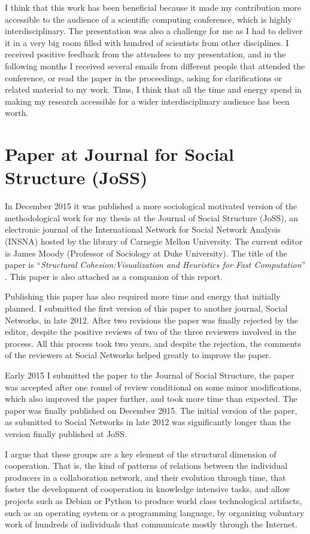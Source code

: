 I think that this work has been beneficial because it made my contribution more accessible to the audience of a scientific computing conference, which is highly interdisciplinary. The presentation was also a challenge for me as I had to deliver it in a very big room filled with hundred of scientists from other disciplines. I received positive feedback from the attendees to my presentation, and in the following months I received several emails from different people that attended the conference, or read the paper in the proceedings, asking for clarifications or related material to my work. Thus, I think that all the time and energy spend in making my research accessible for a wider interdisciplinary audience has been worth.

\section{Paper at Journal for Social Structure (JoSS)}

In December 2015 it was published a more sociological motivated version of the methodological work for my thesis at the Journal of Social Structure (JoSS), an electronic journal of the International Network for Social Network Analysis (INSNA) hosted by the library of Carnegie Mellon University. The current editor is James Moody (Professor of Sociology at Duke University). The title of the paper is ``\textit{Structural Cohesion:Visualization and Heuristics for Fast Computation}'' \citep{torrents:2015}. This paper is also attached as a companion of this report.

Publishing this paper has also required more time and energy that initially planned. I submitted the first version of this paper to another journal, Social Networks, in late 2012. After two revisions the paper was finally rejected by the editor, despite the positive reviews of two of the three reviewers involved in the process. All this process took two years, and despite the rejection, the comments of the reviewers at Social Networks helped greatly to improve the paper.

Early 2015 I submitted the paper to the Journal of Social Structure, the paper was accepted after one round of review conditional on some minor modifications, which also improved the paper further, and took more time than expected. The paper was finally published on December 2015. The initial version of the paper, as submitted to Social Networks in late 2012 was significantly longer than the version finally published at JoSS.

I argue that these groups are a key element of the structural dimension of cooperation. That is, the kind of patterns of relations between the individual producers in a collaboration network, and their evolution through time, that foster the development of cooperation in knowledge intensive tasks, and allow projects such as Debian or Python to produce world class technological artifacts, such as an operating system or a programming language, by organizing voluntary work of hundreds of individuals that communicate mostly through the Internet.
